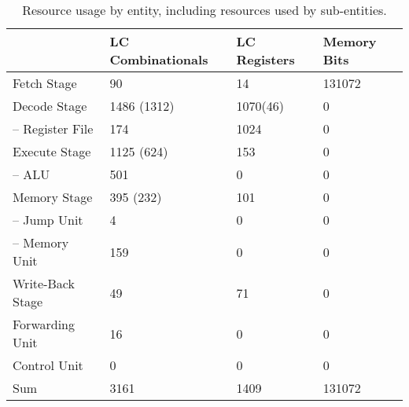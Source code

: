 \begin{table}[htb]
  \centering
  \caption{Resource usage by entity, including resources used by sub-entities.}
  \begin{tabular}{llll}
    \toprule
                         & LC Combinationals & LC Registers & Memory Bits \\
    \midrule
    Fetch Stage          & 90                & 14           & 131072      \\
    Decode Stage         & 1486 (1312)       & 1070(46)     & 0           \\
    -- Register File     & 174               & 1024         & 0           \\
    Execute Stage        & 1125 (624)        & 153          & 0           \\
    -- ALU               & 501               & 0            & 0           \\
    Memory Stage         & 395 (232)         & 101          & 0           \\
    -- Jump Unit         & 4                 & 0            & 0           \\
    -- Memory Unit       & 159               & 0            & 0           \\
    Write-Back Stage     & 49                & 71           & 0           \\
    Forwarding Unit      & 16                & 0            & 0           \\
    Control Unit         & 0                 & 0            & 0           \\
    \cmidrule{1-4}
    Sum                  & 3161              & 1409         & 131072      \\
    \bottomrule
  \end{tabular}
\end{table}

\begin{qa}
\end{qa}
